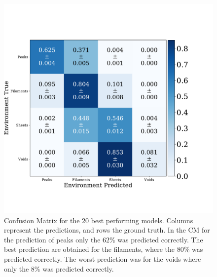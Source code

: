 \documentclass[usenatbib]{mnras}
\begin{document}
\begin{figure}
\centering
    \includegraphics[scale=0.33]{Figs/p_confusion_matrix_20.pdf}
    \caption{Confusion Matrix for the 20 best performing
      models. Columns represent the predictions, and rows the ground
      truth. In the CM for the prediction of peaks only the $62\%$ was
      predicted correctly. The best prediction are obtained for the
      filaments, where the $80\%$ was predicted correctly. The worst
      prediction was for the voids where only the $8\%$ was predicted
      correctly.} 
    \label{fig:confusion_matrix}    
\end{figure}
\end{document}

